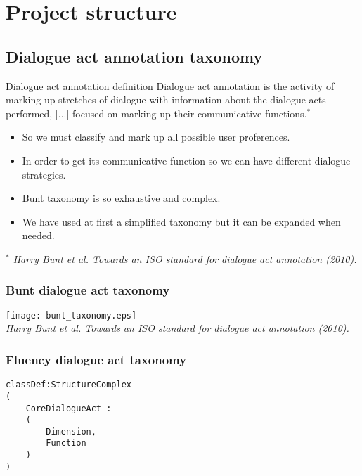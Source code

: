 \documentclass[11pt]{beamer}
\begin{document}
\section{Project structure}

\subsection{Dialogue act annotation taxonomy}

\begin{frame}[fragile]
	\begin{block}{Dialogue act annotation definition}
			Dialogue act annotation is the activity of marking up
			stretches of dialogue with information about the dialogue
			acts performed, [...] focused on marking
			up their communicative functions.$^*$
	\end{block}
	\pause
	\begin{itemize}
		\item So we must classify and mark up all possible user proferences.
		\item In order to get its communicative function so we can have different dialogue strategies.
		\item Bunt taxonomy is so exhaustive and complex.
		\item We have used at first a simplified taxonomy but it can be expanded when needed.
	\end{itemize}
	\scriptsize
	\emph{$^*$ Harry Bunt et al. Towards an ISO standard for dialogue act annotation (2010).}
\end{frame}

\begin{frame}[fragile]
\frametitle{Bunt dialogue act taxonomy}
	\begin{center}
		\texttt{[image: bunt\_taxonomy.eps]}\\
		\scriptsize
		\emph{Harry Bunt et al. Towards an ISO standard for dialogue act annotation (2010).}
	\end{center}
\end{frame}

\begin{frame}[fragile]
\frametitle{Fluency dialogue act taxonomy}
	\scriptsize
	\begin{lstlisting}[language=lekta]
classDef:StructureComplex
(
	CoreDialogueAct :
	(
	 	Dimension,
		Function
	)
)
	\end{lstlisting}
	\normalsize
	\begin{center}
	\end{center}
\end{frame}
\end{document}
